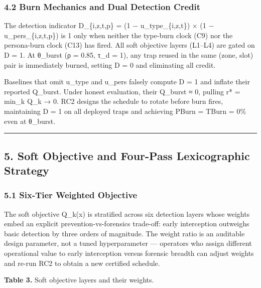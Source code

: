 \documentclass[
  11pt,
]{article}
\begin{document}
\hypertarget{burn-mechanics-and-dual-detection-credit}{%
\subsubsection{4.2 Burn Mechanics and Dual Detection
Credit}\label{burn-mechanics-and-dual-detection-credit}}

The detection indicator D\_\{i,z,t,p\} = (1 − u\_type\_\{i,z,t\}) × (1 −
u\_pers\_\{i,z,t,p\}) is 1 only when neither the type-burn clock (C9)
nor the persona-burn clock (C13) has fired. All soft objective layers
(L1--L4) are gated on D = 1. At θ\_burst (ρ = 0.85, τ\_d = 1), any trap
reused in the same (zone, slot) pair is immediately burned, setting D =
0 and eliminating all credit.

Baselines that omit u\_type and u\_pers falsely compute D = 1 and
inflate their reported Q\_burst. Under honest evaluation, their Q\_burst
≈ 0, pulling r* = min\_k Q\_k → 0. RC2 designs the schedule to rotate
before burn fires, maintaining D = 1 on all deployed traps and achieving
PBurn = TBurn = 0\% even at θ\_burst.

\begin{center}\rule{0.5\linewidth}{0.5pt}\end{center}

\hypertarget{soft-objective-and-four-pass-lexicographic-strategy}{%
\subsection{5. Soft Objective and Four-Pass Lexicographic
Strategy}\label{soft-objective-and-four-pass-lexicographic-strategy}}

\hypertarget{six-tier-weighted-objective}{%
\subsubsection{5.1 Six-Tier Weighted
Objective}\label{six-tier-weighted-objective}}

The soft objective Q\_k(x) is stratified across six detection layers
whose weights embed an explicit prevention-vs-forensics trade-off: early
interception outweighs basic detection by three orders of magnitude. The
weight ratio is an auditable design parameter, not a tuned
hyperparameter --- operators who assign different operational value to
early interception versus forensic breadth can adjust weights and re-run
RC2 to obtain a new certified schedule.

\textbf{Table 3.} Soft objective layers and their weights.
\end{document}
